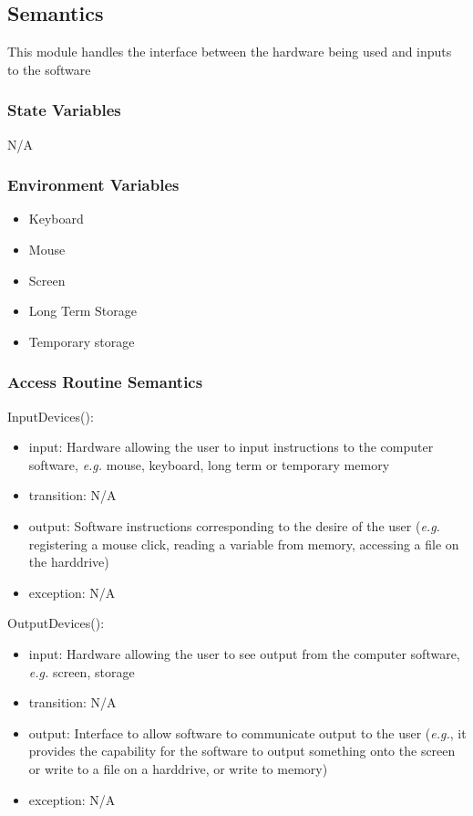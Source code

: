 \documentclass[12pt, titlepage]{article}
\begin{document}
\subsection{Semantics}
This module handles the interface between the hardware being used and inputs to
the software

\subsubsection{State Variables}
N/A

\subsubsection{Environment Variables}
\begin{itemize}
    \item Keyboard
    \item Mouse
    \item Screen
    \item Long Term Storage
    \item Temporary storage
\end{itemize}


\subsubsection{Access Routine Semantics}

\noindent InputDevices():
\begin{itemize}
    \item input: Hardware allowing the user to input instructions to the
    computer software, \textit{e.g.} mouse, keyboard, long term or temporary memory
    \item transition: N/A
    \item output: Software instructions corresponding to the desire of the user
    (\textit{e.g.} registering a mouse click, reading a variable from memory,
    accessing a file on the harddrive)
    \item exception: N/A
\end{itemize}

\noindent OutputDevices():
\begin{itemize}
    \item input: Hardware allowing the user to see output from the computer
    software, \textit{e.g.} screen, storage
    \item transition: N/A
    \item output: Interface to allow software to communicate output to the user
    (\textit{e.g.}, it provides the capability for the software to output something
    onto the screen or write to a file on a harddrive, or write to memory)
    \item exception: N/A
\end{itemize}
\end{document}
